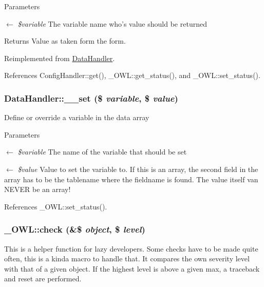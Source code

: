 \begin{DoxyParams}{Parameters}
\item[\mbox{$\leftarrow$} {\em \$variable}]The variable name who's value should be returned \end{DoxyParams}
\begin{DoxyReturn}{Returns}
Value as taken form the form. 
\end{DoxyReturn}


Reimplemented from \hyperlink{classDataHandler_af58cbd10b032e4904fa15ce950d521e2}{DataHandler}.



References ConfigHandler::get(), \_\-OWL::get\_\-status(), and \_\-OWL::set\_\-status().

\subsubsection[{\_\-\_\-set}]{\setlength{\rightskip}{0pt plus 5cm}DataHandler::\_\-\_\-set (\$ {\em variable}, \/  \$ {\em value})}\label{classDataHandler_a16c81c9564a7feaf530ce5d51ed99df7}
Define or override a variable in the data array


\begin{DoxyParams}{Parameters}
\item[\mbox{$\leftarrow$} {\em \$variable}]The name of the variable that should be set \item[\mbox{$\leftarrow$} {\em \$value}]Value to set the variable to. If this is an array, the second field in the array has to be the tablename where the fieldname is found. The value itself van NEVER be an array! \end{DoxyParams}


References \_\-OWL::set\_\-status().

\subsubsection[{check}]{\setlength{\rightskip}{0pt plus 5cm}\_\-OWL::check (\&\$ {\em object}, \/  \$ {\em level})}\label{class__OWL_ad6f4f6946f40199dd0333cf219fa500e}
This is a helper function for lazy developers. Some checks have to be made quite often, this is a kinda macro to handle that. It compares the own severity level with that of a given object. If the highest level is above a given max, a traceback and reset are performed.


